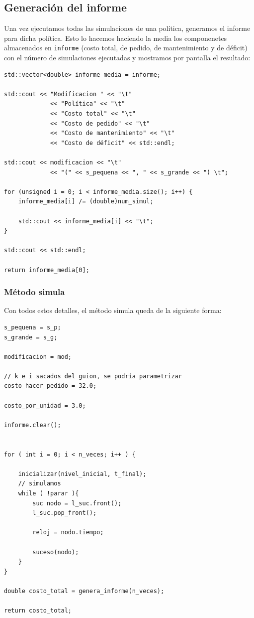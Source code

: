 \documentclass[12pt, spanish]{article}
\begin{document}
\subsection{Generación del informe}

Una vez ejecutamos todas las simulaciones de una política, generamos el informe para dicha política. Esto lo hacemos haciendo la media los componenetes almacenados en \texttt{informe} (costo total, de pedido, de mantenimiento y de déficit) con el número de simulaciones ejecutadas y mostramos por pantalla el resultado:

\begin{lstlisting}
std::vector<double> informe_media = informe;

std::cout << "Modificacion " << "\t"
			 << "Política" << "\t"
			 << "Costo total" << "\t"
			 << "Costo de pedido" << "\t"
			 << "Costo de mantenimiento" << "\t"
			 << "Costo de déficit" << std::endl;

std::cout << modificacion << "\t"
			 << "(" << s_pequena << ", " << s_grande << ") \t";

for (unsigned i = 0; i < informe_media.size(); i++) {
	informe_media[i] /= (double)num_simul;

	std::cout << informe_media[i] << "\t";
}

std::cout << std::endl;

return informe_media[0];
\end{lstlisting}


\subsubsection{Método simula}

Con todos estos detalles, el método simula queda de la siguiente forma:

\begin{lstlisting}
s_pequena = s_p;
s_grande = s_g;

modificacion = mod;

// k e i sacados del guion, se podría parametrizar
costo_hacer_pedido = 32.0;

costo_por_unidad = 3.0;

informe.clear();


for ( int i = 0; i < n_veces; i++ ) {

	inicializar(nivel_inicial, t_final);
	// simulamos
	while ( !parar ){
		suc nodo = l_suc.front();
		l_suc.pop_front();

		reloj = nodo.tiempo;

		suceso(nodo);
	}
}

double costo_total = genera_informe(n_veces);

return costo_total;
\end{lstlisting}
\end{document}
